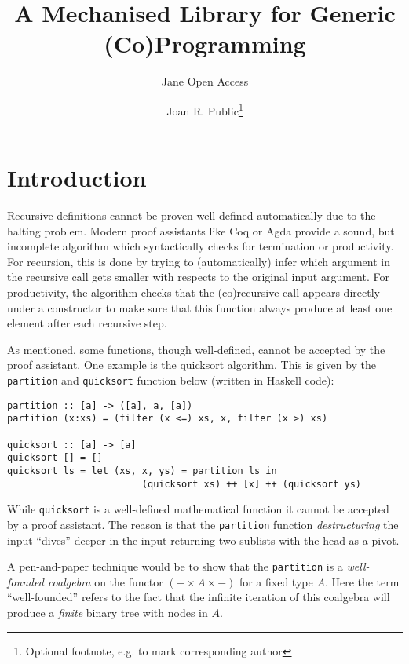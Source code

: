 \documentclass[a4paper, UKenglish, cleveref, autoref, thm-restate]{lipics-v2021}
\title{A Mechanised Library for Generic (Co)Programming}
\author{Jane {Open Access}}{Dummy University Computing Laboratory, [optional: Address], Country \and My second affiliation, Country \and \url{http://www.myhomepage.edu} }{johnqpublic@dummyuni.org}{https://orcid.org/0000-0002-1825-0097}{(Optional) author-specific funding acknowledgements}%
\author{Joan R. Public\footnote{Optional footnote, e.g. to mark corresponding author}}{Department of Informatics, Dummy College, [optional: Address], Country}{joanrpublic@dummycollege.org}{[orcid]}{[funding]}
\newcommand{\haskell}[1]{\texttt{#1}}
\begin{document}
\maketitle

\begin{abstract}

\end{abstract}

\section{Introduction}
Recursive definitions cannot be proven well-defined automatically due to the
halting problem. Modern proof assistants like Coq or Agda provide a sound, but
incomplete algorithm which syntactically checks for termination or productivity.
For recursion, this is done by trying to (automatically) infer which argument in
the recursive call gets smaller with respects to the original input argument.
For productivity, the algorithm checks that the (co)recursive call appears
directly under a constructor to make sure that this function always produce at
least one element after each recursive step.

As mentioned, some functions, though well-defined, cannot be accepted by the
proof assistant. One example is the quicksort algorithm. This is given by the
\haskell{partition} and \haskell{quicksort} function below (written in Haskell
code):
\begin{verbatim}
partition :: [a] -> ([a], a, [a])
partition (x:xs) = (filter (x <=) xs, x, filter (x >) xs)

quicksort :: [a] -> [a]
quicksort [] = []
quicksort ls = let (xs, x, ys) = partition ls in
                        (quicksort xs) ++ [x] ++ (quicksort ys)
\end{verbatim}
While \haskell{quicksort} is a well-defined mathematical function it cannot be
accepted by a proof assistant.  The reason is that the \haskell{partition}
function \emph{destructuring} the input ``dives'' deeper in the input returning
two sublists with the head as a pivot.

A pen-and-paper technique would be to show that the \haskell{partition} is a
\emph{well-founded coalgebra} on the functor $(- \times A \times -)$ for a fixed
type $A$. Here the term ``well-founded'' refers to the fact that the infinite
iteration of this coalgebra will produce a \emph{finite} binary tree with nodes
in $A$.
\end{document}
